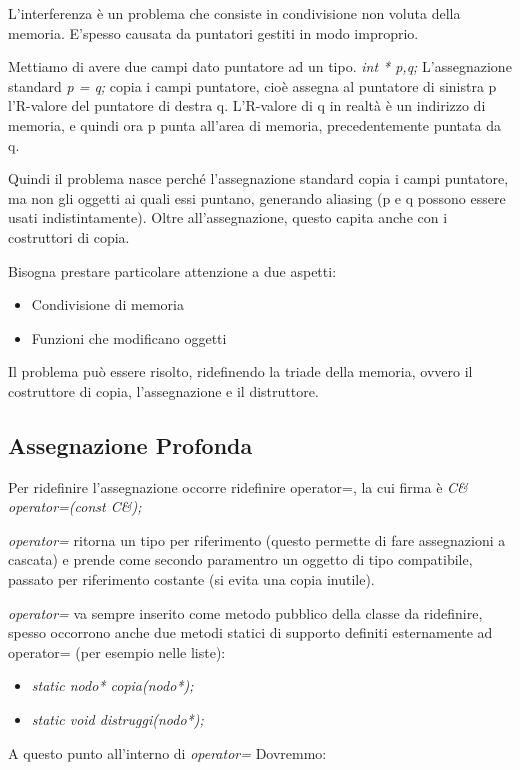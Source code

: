L'interferenza è un problema che consiste in condivisione non voluta della memoria. E'spesso causata da puntatori gestiti in modo improprio.

Mettiamo di avere due campi dato puntatore ad un tipo. \textit{int * p,q;}
L'assegnazione standard \textit{p = q;} copia i campi puntatore, cioè assegna al puntatore di sinistra p l'R-valore del puntatore di destra q.
L'R-valore di q in realtà è un indirizzo di memoria, e quindi ora p punta all'area di memoria, precedentemente puntata da q.

Quindi il problema nasce perché l'assegnazione standard copia i campi puntatore, ma non gli oggetti ai quali essi puntano, generando aliasing (p e q possono essere usati 
indistintamente). Oltre all'assegnazione, questo capita anche con i costruttori di copia.

Bisogna prestare particolare attenzione a due aspetti:
\begin{itemize}
	\item Condivisione di memoria
	\item Funzioni che modificano oggetti
\end{itemize}

Il problema può essere risolto, ridefinendo la triade della memoria, ovvero il costruttore di copia, l'assegnazione e il distruttore.

\subsection{Assegnazione Profonda}
Per ridefinire l'assegnazione occorre ridefinire operator=, la cui firma è \textit{C\& operator=(const C\&);} 

\textit{operator=} ritorna un tipo per riferimento (questo permette di fare assegnazioni a cascata) e prende come secondo paramentro un oggetto di tipo compatibile, passato per riferimento costante (si evita una copia inutile).

\textit{operator=} va sempre inserito come metodo pubblico della classe da ridefinire, spesso occorrono anche due metodi statici di supporto definiti esternamente ad operator= (per esempio nelle liste): 

\begin{itemize}
	\item \textit{static nodo* copia(nodo*);}
	\item \textit{static void distruggi(nodo*);}
\end{itemize}

A questo punto all'interno di \textit{operator=} Dovremmo:

